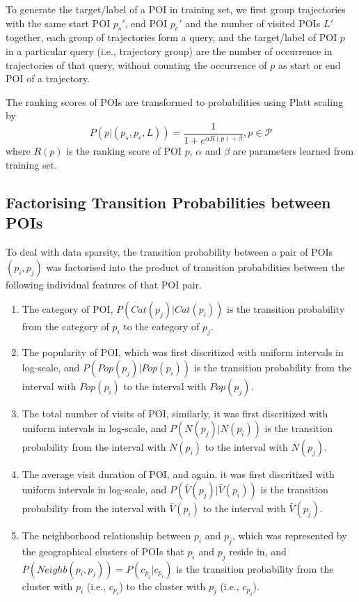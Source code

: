 \documentclass{sig-alternate-05-2015}
\begin{document}
To generate the target/label of a POI in training set,
we first group trajectories with the same start POI $p_s'$, end POI $p_e'$ and the number of visited POIs $L'$ together,
each group of trajectories form a query,
and the target/label of POI $p$ in a particular query (i.e., trajectory group) are the number of occurrence
in trajectories of that query, 
without counting the occurrence of $p$ as start or end POI of a trajectory.

The ranking scores of POIs are transformed to probabilities using Platt scaling\cite{platt99} by
\begin{displaymath}
    P(p |(p_s, p_e, L)) = \frac{1}{1 + e^{\alpha R(p) + \beta}}, p \in \mathcal{P}
\end{displaymath}
where $R(p)$ is the ranking score of POI $p$, $\alpha$ and $\beta$ are parameters learned from training set\cite{plattnote07}.


\subsection{Factorising Transition Probabilities between POIs}
To deal with data sparsity,
the transition probability between a pair of POIs $(p_i, p_j)$ was factorised into the product of
transition probabilities between the following individual features of that POI pair.
\begin{enumerate}
\item The category of POI, $P(Cat(p_j) | Cat(p_i))$
      is the transition probability from the category of $p_i$ to the category of $p_j$.
\item The popularity of POI, which was first discritized with uniform intervals in log-scale,
      and $P(Pop(p_j) | Pop(p_i))$ is the transition probability from the interval with $Pop(p_i)$ 
      to the interval with $Pop(p_j)$.
\item The total number of visits of POI, similarly, it was first discritized with uniform intervals in log-scale,
      and $P(N(p_j) | N(p_i))$ is the transition probability from the interval with $N(p_i)$ 
      to the interval with $N(p_j)$.
\item The average visit duration of POI, and again, it was first discritized with uniform intervals in log-scale,
      and $P(\bar{V}(p_j) | \bar{V}(p_i))$ is the transition probability from the interval with $\bar{V}(p_i)$ 
      to the interval with $\bar{V}(p_j)$.
\item The neighborhood relationship between $p_i$ and $p_j$,
      which was represented by the geographical clusters of POIs that $p_i$ and $p_j$ reside in,
      and $P(Neighb(p_i, p_j)) = P(c_{p_j} | c_{p_i})$ is the transition probability from the cluster with 
      $p_i$ (i.e., $c_{p_i}$) to the cluster with $p_j$ (i.e., $c_{p_j}$).
\end{enumerate}
\end{document}
